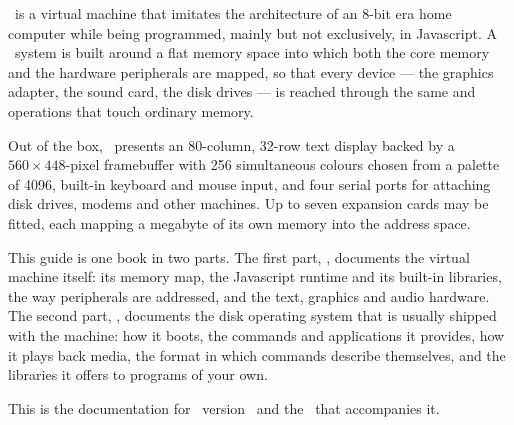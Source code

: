 \thismachine\ is a virtual machine that imitates the architecture of an 8-bit era home computer while being programmed, mainly but not exclusively, in Javascript. A \thismachine\ system is built around a flat memory space into which both the core memory and the hardware peripherals are mapped, so that every device --- the graphics adapter, the sound card, the disk drives --- is reached through the same  and  operations that touch ordinary memory.

Out of the box, \thismachine\ presents an 80-column, 32-row text display backed by a $560\times448$-pixel framebuffer with 256 simultaneous colours chosen from a palette of 4096, built-in keyboard and mouse input, and four serial ports for attaching disk drives, modems and other machines. Up to seven expansion cards may be fitted, each mapping a megabyte of its own memory into the address space.

This guide is one book in two parts. The first part, \emph{\thismachine}, documents the virtual machine itself: its memory map, the Javascript runtime and its built-in libraries, the way peripherals are addressed, and the text, graphics and audio hardware. The second part, \emph{\thedos}, documents the disk operating system that is usually shipped with the machine: how it boots, the commands and applications it provides, how it plays back media, the format in which commands describe themselves, and the libraries it offers to programs of your own.

This is the documentation for \thismachine\ version \tsvmver\ and the \thedos\ that accompanies it.

